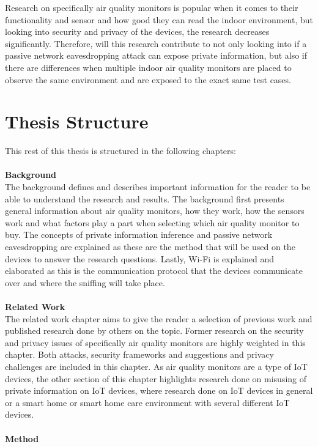 Research on specifically air quality monitors is popular when it comes to their functionality and sensor and how good they can read the indoor environment, but looking into security and privacy of the devices, the research decreases significantly. Therefore, will this research contribute to not only looking into if a passive network eavesdropping attack can expose private information, but also if there are differences when multiple indoor air quality monitors are placed to observe the same environment and are exposed to the exact same test cases. 

\section{Thesis Structure}
This rest of this thesis is structured in the following chapters:\\\\
\textbf{Background}
\\
The background defines and describes important information for the reader to be able to understand the research and results. The background first presents general information about air quality monitors, how they work, how the sensors work and what factors play a part when selecting which air quality monitor to buy. The concepts of private information inference and passive network eavesdropping are explained as these are the method that will be used on the devices to answer the research questions. Lastly, \gls{Wi-Fi} is explained and elaborated as this is the communication protocol that the devices communicate over and where the sniffing will take place. 
\\\\
\textbf{Related Work}
\\
The related work chapter aims to give the reader a selection of previous work and published research done by others on the topic. Former research on the security and privacy issues of specifically air quality monitors are highly weighted in this chapter. Both attacks, security frameworks and suggestions and privacy challenges are included in this chapter. As air quality monitors are a type of \gls{IoT} devices, the other section of this chapter highlights research done on misusing of private information on \gls{IoT} devices, where research done on \gls{IoT} devices in general or a smart home or smart home care environment with several different \gls{IoT} devices. 
\\\\
\textbf{Method}
\\
